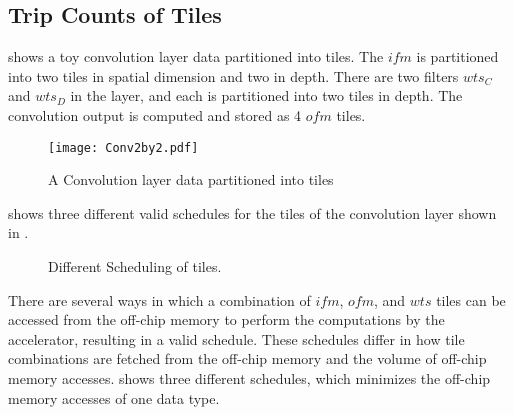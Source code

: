 \subsection{Trip Counts of Tiles}\label{sec:TripCount}
 shows a toy convolution layer data partitioned into tiles. The $ifm$ is partitioned into two tiles in spatial dimension and two in depth. There are two filters $wts_C$ and $wts_D$ in the layer, and each is partitioned into two tiles in depth. The convolution output is computed and stored as 4 $ofm$ tiles.
\begin{figure}[!htb]
	\centering
	\captionsetup{font=sf}	
	\texttt{[image: Conv2by2.pdf]}
	\caption{A Convolution layer data partitioned into tiles }
	\label{fig:convPartitionedLayer}
\end{figure}
 shows three different valid schedules for the tiles of the convolution layer shown in . 
\begin{figure}[!htb]
	\centering
	\captionsetup{font=sf}
    \hfil		
	\hfil	
	\hfil	
	\caption{Different Scheduling of tiles.}
	\label{fig:differentScheduling}
\end{figure}

There are several ways in which a  combination of $ifm$, $ofm$, and $wts$ tiles can be accessed from the off-chip memory to perform the computations by the accelerator, resulting in a valid schedule. These schedules differ in how tile combinations are fetched from the off-chip memory and the volume of off-chip memory accesses.  shows three different schedules, which minimizes the off-chip memory accesses of one data type.

